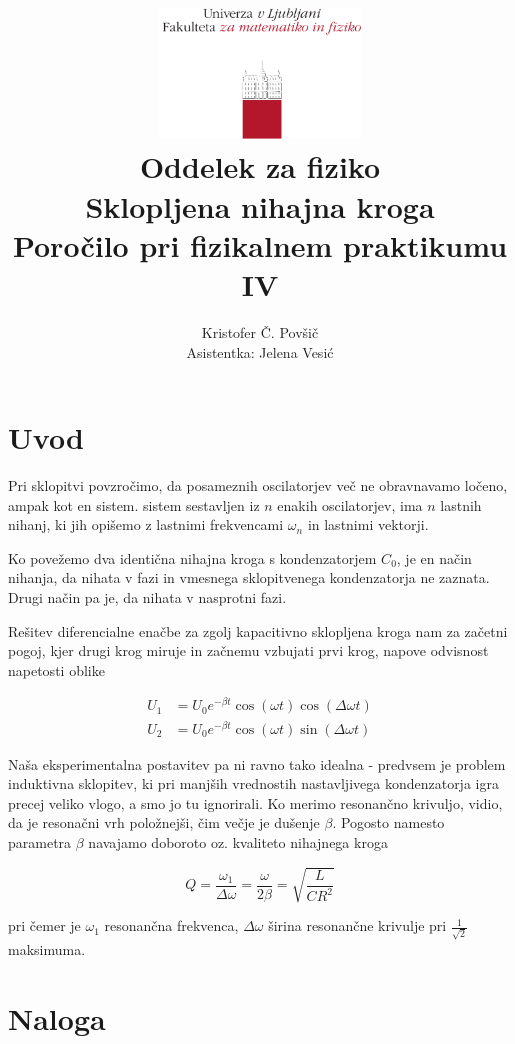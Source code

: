 \documentclass[12pt]{report}
\title{
  \includegraphics[width=0.4\textwidth]{fmf_logo}\\
  {\small Oddelek za fiziko} \\
  {Sklopljena nihajna kroga}\\
  {\small Poročilo pri fizikalnem praktikumu IV}\\

}
\date{}
\author{ Kristofer Č. Povšič \\[5 cm]
 \small  Asistentka: Jelena Vesić
}
\begin{document}
\setcounter{page}{2}

\maketitle

\chapter*{Uvod}

Pri sklopitvi povzročimo, da posameznih oscilatorjev več ne obravnavamo ločeno, ampak kot en sistem. sistem sestavljen iz $n$ enakih oscilatorjev, ima $n$ lastnih nihanj, ki jih opišemo z lastnimi frekvencami $\omega_n$ in lastnimi vektorji. 

Ko povežemo dva identična nihajna kroga s kondenzatorjem $C_0$, je en način nihanja, da nihata v fazi in vmesnega sklopitvenega kondenzatorja ne zaznata. Drugi način pa je, da nihata v nasprotni fazi. 

Rešitev diferencialne enačbe za zgolj kapacitivno sklopljena kroga nam za začetni pogoj, kjer drugi krog miruje in začnemu vzbujati prvi krog, napove odvisnost napetosti oblike


\begin{align*}
  U_1 &= U_0 e^{-\beta t}\cos(\omega t) \cos (\Delta \omega t) \\ 
  U_2 &= U_0 e^{-\beta t} \cos(\omega t) \sin (\Delta \omega t)
\end{align*}


Naša eksperimentalna postavitev pa ni ravno tako idealna - predvsem je problem induktivna sklopitev, ki pri manjših vrednostih nastavljivega kondenzatorja igra precej veliko vlogo, a smo jo tu ignorirali. Ko merimo resonančno krivuljo, vidio, da je resonačni vrh položnejši, čim večje je dušenje $\beta$. Pogosto namesto parametra $\beta$ navajamo doboroto oz. kvaliteto nihajnega kroga 

\begin{equation}
  Q = \frac{\omega_1}{\Delta \omega} = \frac{\omega}{2 \beta} = \sqrt{\frac{L}{CR^2}}
\end{equation}

pri čemer je $\omega_1$ resonančna frekvenca, $\Delta \omega$ širina resonančne krivulje pri $\frac{1}{\sqrt{2}}$ maksimuma. 

\chapter*{Naloga}
\end{document}
